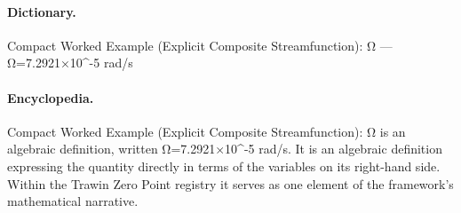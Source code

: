 \paragraph{Dictionary.}
Compact Worked Example (Explicit Composite Streamfunction): Ω — Ω=7.2921×10\textasciicircum{}-5 rad/s

\paragraph{Encyclopedia.}
Compact Worked Example (Explicit Composite Streamfunction): Ω is an algebraic definition, written Ω=7.2921×10\textasciicircum{}-5 rad/s. It is an algebraic definition expressing the quantity directly in terms of the variables on its right-hand side. Within the Trawin Zero Point registry it serves as one element of the framework's mathematical narrative.

